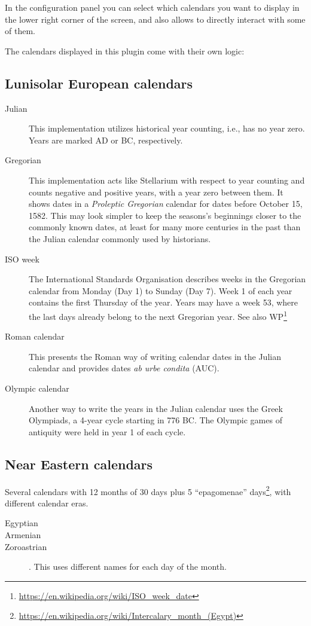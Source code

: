 In the configuration panel you can select which calendars you want to
display in the lower right corner of the screen, and also allows to directly
interact with some of them.


The calendars displayed in this plugin come with their own logic:

\subsection{Lunisolar European calendars}
\begin{description}
\item[Julian] This implementation utilizes historical year counting,
  i.e., has no year zero. Years are marked AD or BC, respectively.
\item[Gregorian] This implementation acts like Stellarium with respect
  to year counting and counts negative and positive years, with a year
  zero between them. It shows dates in a \emph{Proleptic Gregorian}
  calendar for dates before October 15, 1582. This may look simpler to
  keep the seasons's beginnings closer to the commonly known dates, at
  least for many more centuries in the past than the Julian calendar
  commonly used by historians.
\item[ISO week] The International Standards Organisation describes
  weeks in the Gregorian calendar from Monday (Day 1) to Sunday (Day
  7). Week 1 of each year contains the first Thursday of the
  year. Years may have a week 53, where the last days already belong
  to the next Gregorian year. See also WP\footnote{\url{https://en.wikipedia.org/wiki/ISO_week_date}}
\item[Roman calendar] This presents the Roman way of writing calendar
  dates in the Julian calendar and provides dates \emph{ab urbe condita} (AUC).
\item[Olympic calendar] Another way to write the years in the Julian
  calendar uses the Greek Olympiads, a 4-year cycle starting in 776
  BC. The Olympic games of antiquity were held in year 1 of each cycle.
\end{description}

\subsection{Near Eastern calendars}
Several calendars with 12 months of 30 days plus 5 ``epagomenae''
days\footnote{\url{https://en.wikipedia.org/wiki/Intercalary_month_(Egypt)}}, with different calendar eras.
\begin{description}
\item[Egyptian]
\item[Armenian]
\item[Zoroastrian]. This uses different names for each day of the month.
\end{description}

